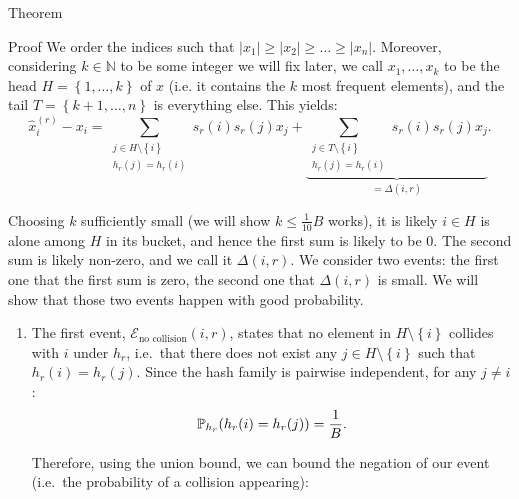 \documentclass[a4paper]{article}
\begin{document}
\begin{parag}{Theorem}
\begin{subparag}{Proof}
        We order the indices such that $\left|x_1\right| \geq \left|x_2\right| \geq \ldots \geq \left|x_n\right|$. Moreover, considering $k \in \mathbb{N}$ to be some integer we will fix later, we call $x_1, \ldots, x_k$ to be the head $H = \left\{1, \ldots, k\right\}$ of $x$ (i.e. it contains the $k$ most frequent elements), and the tail $T = \left\{k+1, \ldots, n\right\}$ is everything else. This yields: 
        \[\hat{x}_i^{\left(r\right)} - x_i = \sum_{\substack{j \in H \setminus \left\{i\right\} \\ h_r\left(j\right) = h_r\left(i\right)}} s_r\left(i\right) s_r\left(j\right) x_j + \underbrace{\sum_{\substack{j \in T \setminus \left\{i\right\} \\ h_r\left(j\right) = h_r\left(i\right)}} s_r\left(i\right) s_r\left(j\right) x_j}_{= \Delta\left(i, r\right)}.\]

        Choosing $k$ sufficiently small  (we will show $k \leq \frac{1}{10} B$ works), it is likely $i \in H$ is alone among $H$ in its bucket, and hence the first sum is likely to be $0$. The second sum is likely non-zero, and we call it $\Delta\left(i, r\right)$. We consider two events: the first one that the first sum is zero, the second one that $\Delta\left(i, r\right)$ is small. We will show that those two events happen with good probability.
        \begin{enumerate}[left=0pt]
            \item The first event, $\mathcal{E}_{\text{no collision}}\left(i, r\right)$, states that no element in $H \setminus \left\{i\right\}$ collides with $i$ under $h_r$, i.e.\ that there does not exist any $j \in H \setminus \left\{i\right\}$ such that $h_r\left(i\right) = h_r\left(j\right)$. Since the hash family is pairwise independent, for any $j \neq i$: 
        \[\prob_{h_r}\left(h_r\left(i\right) = h_r\left(j\right)\right) = \frac{1}{B}.\]
        
        Therefore, using the union bound, we can bound the negation of our event (i.e.\ the probability of a collision appearing): 


\end{enumerate}
\end{subparag}
\end{parag}
\end{document}
